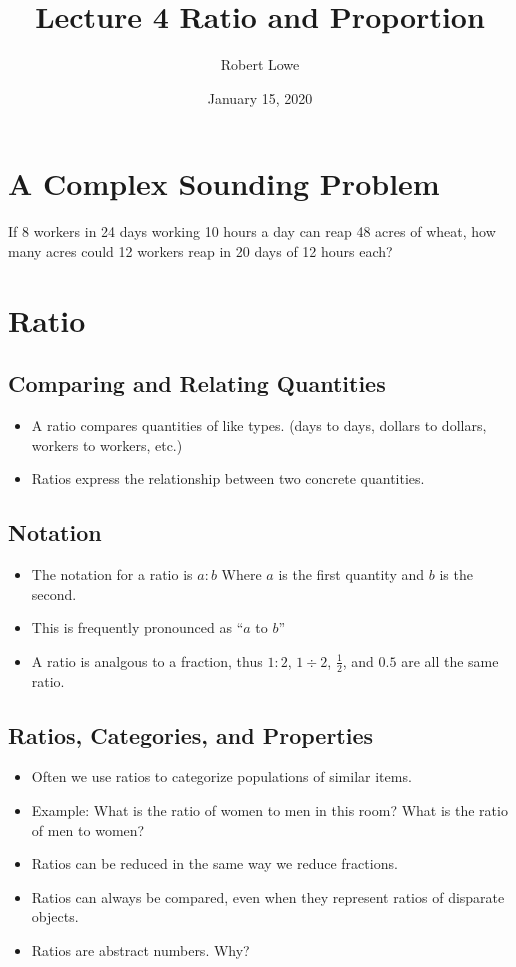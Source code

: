 \documentclass{article}
\title{Lecture 4 Ratio and Proportion}
\author{Robert Lowe}
\date{January 15, 2020}
\begin{document}
\maketitle
\section*{A Complex Sounding Problem}
If 8 workers in 24 days working 10 hours a day can reap 48 acres of wheat, how many acres could 12 workers reap in 20 days of 12 hours each?

\section*{Ratio}
\subsection*{Comparing and Relating Quantities}
\begin{itemize}
    \item A ratio compares quantities of like types. (days to days, dollars to dollars, 
    workers to workers, etc.)
    \item Ratios express the relationship between two concrete quantities.
\end{itemize}

\subsection*{Notation}
\begin{itemize}
    \item The notation for a ratio is $a:b$ Where $a$ is the first quantity and $b$ is the second.
    \item This is frequently pronounced as ``$a$ to $b$''
    \item A ratio is analgous to a fraction, thus $1:2$, $1\div 2$, $\frac{1}{2}$, and $0.5$ are all the same ratio.
\end{itemize}

\subsection*{Ratios, Categories, and Properties}
\begin{itemize}
    \item Often we use ratios to categorize populations of similar items.
    \item Example:  What is the ratio of women to men in this room? What is the ratio of men to women?
    \item Ratios can be reduced in the same way we reduce fractions.
    \item Ratios can always be compared, even when they represent ratios of disparate objects.
    \item Ratios are abstract numbers. Why?
\end{itemize}
\end{document}
